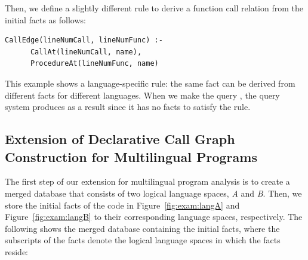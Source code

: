 Then, we define a slightly different rule to derive a function call relation
from the initial facts as follows: 

\begin{lstlisting}[style=mrule]
    CallEdge(lineNumCall, lineNumFunc) :-
      CallAt(lineNumCall, name),
      ProcedureAt(lineNumFunc, name)
\end{lstlisting}

\noindent
This example shows a language-specific rule:
the same fact  can be derived from different facts for
different languages. When we make the query ,
the query system produces  as a result
since it has no facts to satisfy the rule.

%


\subsection{Extension of Declarative Call Graph Construction for Multilingual Programs}


The first step of our extension for multilingual program analysis is to create a
merged database that consists of two logical language spaces, {\it A} and {\it
B}. Then, we store the initial facts of the code in Figure~\ref{fig:exam:langA} and
Figure~\ref{fig:exam:langB} to
their corresponding language spaces, respectively. The following shows the merged
database containing the initial facts, where the subscripts of the facts denote
the logical language spaces in which the facts reside: 

